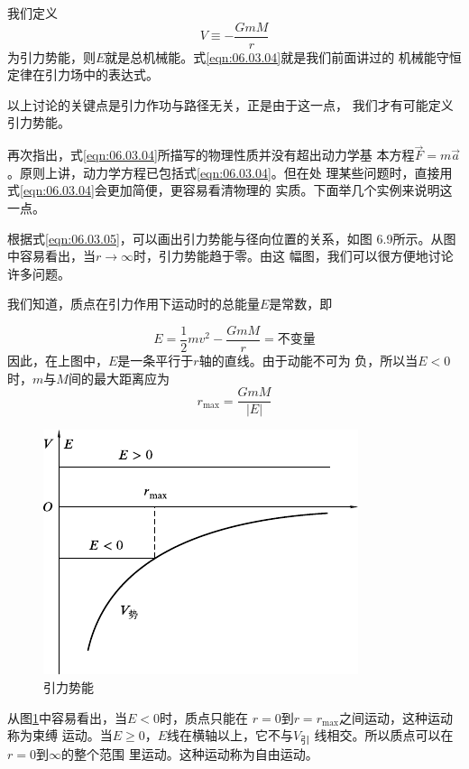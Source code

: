 我们定义
\begin{equation}\label{eqn:06.03.05}
  V \equiv - \frac { G m M } { r }
\end{equation}
为引力势能，则$ E $就是总机械能。式\eqref{eqn:06.03.04}就是我们前面讲过的
机械能守恒定律在引力场中的表达式。

以上讨论的关键点是引力作功与路径无关，正是由于这一点，
我们才有可能定义引力势能。

再次指出，式\eqref{eqn:06.03.04}所描写的物理性质并没有超出动力学基
本方程$ \vec{F} = m \vec{a} $。原则上讲，动力学方程已包括式\eqref{eqn:06.03.04}。但在处
理某些问题时，直接用式\eqref{eqn:06.03.04}会更加简便，更容易看清物理的
实质。下面举几个实例来说明这一点。

根据式\eqref{eqn:06.03.05}，可以画出引力势能与径向位置的关系，如图
6.9所示。从图中容易看出，当$ r \to \infty $时，引力势能趋于零。由这
幅图，我们可以很方便地讨论许多问题。

我们知道，质点在引力作用下运动时的总能量$ E $是常数，即

\begin{equation*}
  E = \frac { 1 } { 2 } m v ^ { 2 } - \frac { G m M } { r } = \text{不变量}
\end{equation*}
因此，在上图中，$ E $是一条平行于$ r $轴的直线。由于动能不可为
负，所以当$ E < 0 $时，$ m $与$ M $间的最大距离应为
\begin{equation*}
  r _ { \max } = \frac { G m M } { | E | }
\end{equation*}
\begin{figure}
  \vspace{-1.3em}
  \centering
  \includegraphics{figure/fig06.09}
  \caption{引力势能}
  \label{fig:06.09}
\end{figure}
从图\ref{fig:06.09}中容易看出，当$ E < 0 $时，质点只能在
$ r = 0 $到$ r = r _ { \max } $之间运动，这种运动称为束缚
运动。当$ E \geqslant 0 $，$ E $线在横轴以上，它不与$ V_\text{引} $
线相交。所以质点可以在$ r = 0 $到$ \infty $的整个范围
里运动。这种运动称为自由运动。

